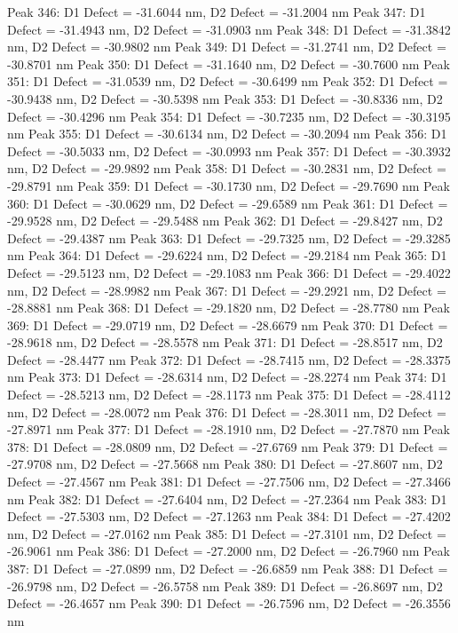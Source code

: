\documentclass{article}
\begin{document}
Peak 346: D1 Defect = -31.6044 nm, D2 Defect = -31.2004 nm
Peak 347: D1 Defect = -31.4943 nm, D2 Defect = -31.0903 nm
Peak 348: D1 Defect = -31.3842 nm, D2 Defect = -30.9802 nm
Peak 349: D1 Defect = -31.2741 nm, D2 Defect = -30.8701 nm
Peak 350: D1 Defect = -31.1640 nm, D2 Defect = -30.7600 nm
Peak 351: D1 Defect = -31.0539 nm, D2 Defect = -30.6499 nm
Peak 352: D1 Defect = -30.9438 nm, D2 Defect = -30.5398 nm
Peak 353: D1 Defect = -30.8336 nm, D2 Defect = -30.4296 nm
Peak 354: D1 Defect = -30.7235 nm, D2 Defect = -30.3195 nm
Peak 355: D1 Defect = -30.6134 nm, D2 Defect = -30.2094 nm
Peak 356: D1 Defect = -30.5033 nm, D2 Defect = -30.0993 nm
Peak 357: D1 Defect = -30.3932 nm, D2 Defect = -29.9892 nm
Peak 358: D1 Defect = -30.2831 nm, D2 Defect = -29.8791 nm
Peak 359: D1 Defect = -30.1730 nm, D2 Defect = -29.7690 nm
Peak 360: D1 Defect = -30.0629 nm, D2 Defect = -29.6589 nm
Peak 361: D1 Defect = -29.9528 nm, D2 Defect = -29.5488 nm
Peak 362: D1 Defect = -29.8427 nm, D2 Defect = -29.4387 nm
Peak 363: D1 Defect = -29.7325 nm, D2 Defect = -29.3285 nm
Peak 364: D1 Defect = -29.6224 nm, D2 Defect = -29.2184 nm
Peak 365: D1 Defect = -29.5123 nm, D2 Defect = -29.1083 nm
Peak 366: D1 Defect = -29.4022 nm, D2 Defect = -28.9982 nm
Peak 367: D1 Defect = -29.2921 nm, D2 Defect = -28.8881 nm
Peak 368: D1 Defect = -29.1820 nm, D2 Defect = -28.7780 nm
Peak 369: D1 Defect = -29.0719 nm, D2 Defect = -28.6679 nm
Peak 370: D1 Defect = -28.9618 nm, D2 Defect = -28.5578 nm
Peak 371: D1 Defect = -28.8517 nm, D2 Defect = -28.4477 nm
Peak 372: D1 Defect = -28.7415 nm, D2 Defect = -28.3375 nm
Peak 373: D1 Defect = -28.6314 nm, D2 Defect = -28.2274 nm
Peak 374: D1 Defect = -28.5213 nm, D2 Defect = -28.1173 nm
Peak 375: D1 Defect = -28.4112 nm, D2 Defect = -28.0072 nm
Peak 376: D1 Defect = -28.3011 nm, D2 Defect = -27.8971 nm
Peak 377: D1 Defect = -28.1910 nm, D2 Defect = -27.7870 nm
Peak 378: D1 Defect = -28.0809 nm, D2 Defect = -27.6769 nm
Peak 379: D1 Defect = -27.9708 nm, D2 Defect = -27.5668 nm
Peak 380: D1 Defect = -27.8607 nm, D2 Defect = -27.4567 nm
Peak 381: D1 Defect = -27.7506 nm, D2 Defect = -27.3466 nm
Peak 382: D1 Defect = -27.6404 nm, D2 Defect = -27.2364 nm
Peak 383: D1 Defect = -27.5303 nm, D2 Defect = -27.1263 nm
Peak 384: D1 Defect = -27.4202 nm, D2 Defect = -27.0162 nm
Peak 385: D1 Defect = -27.3101 nm, D2 Defect = -26.9061 nm
Peak 386: D1 Defect = -27.2000 nm, D2 Defect = -26.7960 nm
Peak 387: D1 Defect = -27.0899 nm, D2 Defect = -26.6859 nm
Peak 388: D1 Defect = -26.9798 nm, D2 Defect = -26.5758 nm
Peak 389: D1 Defect = -26.8697 nm, D2 Defect = -26.4657 nm
Peak 390: D1 Defect = -26.7596 nm, D2 Defect = -26.3556 nm
\end{document}
